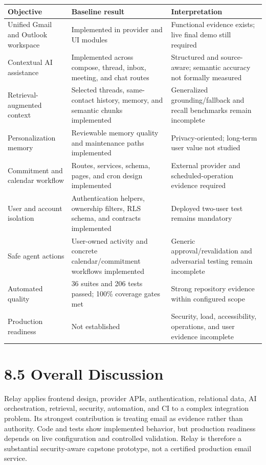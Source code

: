 \documentclass[
]{report}
\begin{document}
\begin{longtable}[]{@{}p{}p{}p{}@{}}
\toprule\noalign{}
Objective & Baseline result & Interpretation \\
\midrule\noalign{}
\endhead
\bottomrule\noalign{}
\endlastfoot
Unified Gmail and Outlook workspace & Implemented in provider and UI
modules & Functional evidence exists; live final demo still required \\
Contextual AI assistance & Implemented across compose, thread, inbox,
meeting, and chat routes & Structured and source-aware; semantic
accuracy not formally measured \\
Retrieval-augmented context & Selected threads, same-contact history,
memory, and semantic chunks implemented & Generalized grounding/fallback
and recall benchmarks remain incomplete \\
Personalization memory & Reviewable memory quality and maintenance paths
implemented & Privacy-oriented; long-term user value not studied \\
Commitment and calendar workflow & Routes, services, schema, pages, and
cron design implemented & External provider and scheduled-operation
evidence required \\
User and account isolation & Authentication helpers, ownership filters,
RLS schema, and contracts implemented & Deployed two-user test remains
mandatory \\
Safe agent actions & User-owned activity and concrete calendar/commitment
workflows implemented & Generic approval/revalidation and adversarial
testing remain incomplete \\
Automated quality & 36 suites and 206 tests passed; 100\% coverage gates
met & Strong repository evidence within configured scope \\
Production readiness & Not established & Security, load, accessibility,
operations, and user evidence incomplete \\
\end{longtable}

\section{8.5 Overall Discussion}\label{85-overall-discussion}

Relay applies frontend design, provider APIs, authentication, relational
data, AI orchestration, retrieval, security, automation, and CI to a
complex integration problem. Its strongest contribution is treating
email as evidence rather than authority. Code and tests show implemented
behavior, but production readiness depends on live configuration and
controlled validation. Relay is therefore a substantial security-aware
capstone prototype, not a certified production email service.
\end{document}
